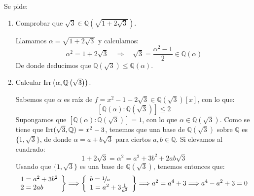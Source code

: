 \begin{ejercicio}
    Se pide:
    \begin{enumerate}
        \item Comprobar que $\sqrt{3}\in \mathbb{Q}\left(\sqrt{1+2\sqrt{3}}\right)$.

            Llamamos $\alpha = \sqrt{1+2\sqrt{3}}$ y calculamos:
            \begin{equation*}
                \alpha^2 = 1+2\sqrt{3} \quad \Longrightarrow \quad  \sqrt{3} = \dfrac{\alpha^{2}-1}{2}\in \mathbb{Q}(\alpha)
            \end{equation*}
            De donde deducimos que $\mathbb{Q}(\sqrt{3})\leq \mathbb{Q}(\alpha)$.
        \item Calcular $\operatorname{Irr}\left(\alpha, \mathbb{Q}\left(\sqrt{3}\right)\right)$.

            Sabemos que $\alpha$ es raíz de $f=x^2-1-2\sqrt{3}\in \mathbb{Q}\left(\sqrt{3}\right)[x]$, con lo que:
            \begin{equation*}
                \left[\mathbb{Q}(\alpha):\mathbb{Q}\left(\sqrt{3}\right)\right] \leq 2
            \end{equation*}
            Supongamos que $\left[\mathbb{Q}(\alpha):\mathbb{Q}\left(\sqrt{3}\right)\right]=1$, con lo que $\alpha\in \mathbb{Q}\left(\sqrt{3}\right)$. Como se tiene que $\operatorname{Irr}(\sqrt{3},\mathbb{Q}) = x^2-3$, tenemos que una base de $\mathbb{Q}\left(\sqrt{3}\right)$ sobre $\mathbb{Q}$ es $\{1,\sqrt{3}\}$, de donde $\alpha = a + b\sqrt{3}$ para ciertos $a,b\in \mathbb{Q}$. Si elevamos al cuadrado:
            \begin{equation*}
                1 + 2\sqrt{3} = \alpha^2 = a^2 + 3b^2 + 2ab\sqrt{3}
            \end{equation*}
            Usando que $\{1,\sqrt{3}\}$ es una base de $\mathbb{Q}\left(\sqrt{3}\right)$, tenemos entonces que:
            \begin{align*}
                \left.\begin{array}{l}
                    1 = a^2 + 3b^2 \\
                    2 = 2 ab
                    \end{array}\right\} &\Longrightarrow \left\{\begin{array}{l}
                    b = \nicefrac{1}{a} \\
                    1 = a^2 + 3\frac{1}{a^2}
            \end{array}\right\} \Longrightarrow a^2 = a^4 + 3\Longrightarrow a^4 - a^2 + 3 = 0
            \end{align*}


\end{enumerate}
\end{ejercicio}
